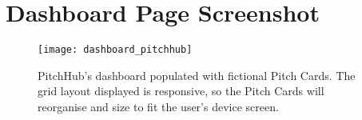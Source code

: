 \chapter{Dashboard Page Screenshot}\label{A:dashboard_pitchhub}

\begin{sidewaysfigure}[ht]
    \centering
    \texttt{[image: dashboard\_pitchhub]}
    \caption{PitchHub's dashboard populated with fictional Pitch Cards. The grid layout displayed is responsive, so the Pitch Cards will reorganise and size to fit the user's device screen.}
\end{sidewaysfigure}

